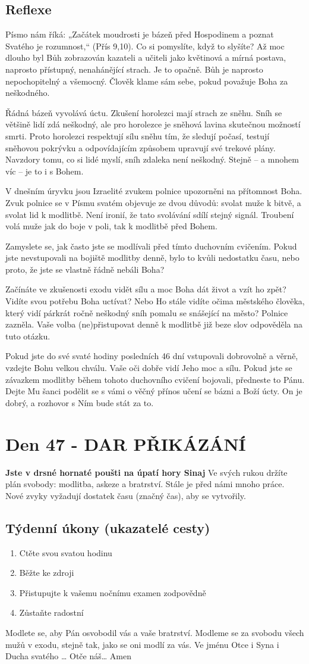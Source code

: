 \documentclass[11pt]{article}
\newcommand{\zacatekSedmyTyden}{
  \textbf{Jste v drsné hornaté poušti na úpatí hory Sinaj} \newline 
  Ve svých rukou držíte plán svobody: modlitba, askeze a bratrství. Stále je před námi mnoho práce. Nové zvyky vyžadují dostatek času (značný čas), aby se vytvořily.

  \subsection*{Týdenní úkony (ukazatelé cesty)}
\begin{enumerate}
  \item Ctěte svou svatou hodinu
  \item Běžte ke zdroji
  \item Přistupujte k vašemu nočnímu examen zodpovědně
  \item Zůstaňte radostní
\end{enumerate}
Modlete se, aby Pán osvobodil vás a vaše bratrství. \newline
Modleme se za svobodu všech mužů v exodu, stejně tak, jako se oni modlí za vás.\newline
Ve jménu Otce i Syna i Ducha svatého …  Otče náš… Amen
}
\begin{document}
\subsection*{Reflexe}
Písmo nám říká: „Začátek moudrosti je bázeň před Hospodinem a poznat Svatého je rozumnost,“ (Přís 9,10). Co si pomyslíte, když
to slyšíte? Až moc dlouho byl Bůh zobrazován kazateli a učiteli jako květinová a mírná postava, naprosto přístupný, nenahánějící
strach. Je to opačně. Bůh je naprosto nepochopitelný a všemocný. Člověk klame sám sebe, pokud považuje Boha za neškodného.

Řádná bázeň vyvolává úctu. Zkušení horolezci mají strach ze sněhu. Sníh se většině lidí zdá neškodný, ale pro horolezce je sněhová
lavina skutečnou možností smrti. Proto horolezci respektují sílu sněhu tím, že sledují počasí, testují sněhovou pokrývku a
odpovídajícím způsobem upravují své trekové plány. Navzdory tomu, co si lidé myslí, sníh zdaleka není neškodný. Stejně – a
mnohem víc – je to i s Bohem.

V dnešním úryvku jsou Izraelité zvukem polnice upozorněni na přítomnost Boha. Zvuk polnice se v Písmu svatém objevuje ze dvou
důvodů: svolat muže k bitvě, a svolat lid k modlitbě. Není ironií, že tato svolávání sdílí stejný signál. Troubení volá muže jak do boje
v poli, tak k modlitbě před Bohem.

Zamyslete se, jak často jste se modlívali před tímto duchovním cvičením. Pokud jste nevstupovali na bojiště modlitby denně, bylo
to kvůli nedostatku času, nebo proto, že jste se vlastně řádně nebáli Boha?

Začínáte ve zkušenosti exodu vidět sílu a moc Boha dát život a vzít ho zpět? Vidíte svou potřebu Boha uctívat? Nebo Ho stále vidíte
očima městského člověka, který vidí párkrát ročně neškodný sníh pomalu se snášející na město? Polnice zazněla. Vaše volba
(ne)přistupovat denně k modlitbě již beze slov odpověděla na tuto otázku.

Pokud jste do své svaté hodiny posledních 46 dní vstupovali dobrovolně a věrně, vzdejte Bohu velkou chválu. Vaše oči dobře vidí
Jeho moc a sílu. Pokud jste se závazkem modlitby během tohoto duchovního cvičení bojovali, předneste to Pánu. Dejte Mu šanci
podělit se s vámi o věčný přínos učení se bázni a Boží úcty. On je dobrý, a rozhovor s Ním bude stát za to.


\newpage
\section{Den 47 - DAR PŘIKÁZÁNÍ }
\zacatekSedmyTyden
\end{document}
